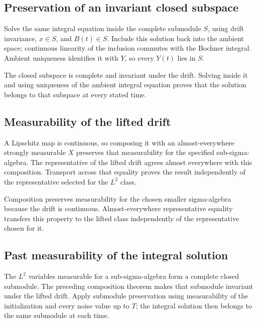\documentclass[11pt,a4paper]{report}
\begin{document}
\subsection{\texorpdfstring{Preservation of an invariant closed subspace}{Preservation of an invariant closed subspace}}
\label{report-step-UnadjustedLangevin-WeakForwardAdapted-lean-1}


Solve the same integral equation inside the complete submodule \(S\), using drift invariance, \(x\in S\), and \(B(t)\in S\). Include this solution back into the ambient space; continuous linearity of the inclusion commutes with the Bochner integral. Ambient uniqueness identifies it with \(Y\), so every \(Y(t)\) lies in \(S\).



The closed subspace is complete and invariant under the drift. Solving inside it and using uniqueness of the ambient integral equation proves that the solution belongs to that subspace at every stated time.

\subsection{\texorpdfstring{Measurability of the lifted drift}{Measurability of the lifted drift}}
\label{report-step-UnadjustedLangevin-WeakForwardAdapted-lean-2}


A Lipschitz map is continuous, so composing it with an almost-everywhere strongly measurable \(X\) preserves that measurability for the specified sub-sigma-algebra. The representative of the lifted drift agrees almost everywhere with this composition. Transport across that equality proves the result independently of the representative selected for the \(L^2\) class.



Composition preserves measurability for the chosen smaller sigma-algebra because the drift is continuous. Almost-everywhere representative equality transfers this property to the lifted class independently of the representative chosen for it.

\subsection{\texorpdfstring{Past measurability of the integral solution}{Past measurability of the integral solution}}
\label{report-step-UnadjustedLangevin-WeakForwardAdapted-lean-3}


The \(L^2\) variables measurable for a sub-sigma-algebra form a complete closed submodule. The preceding composition theorem makes that submodule invariant under the lifted drift. Apply submodule preservation using measurability of the initialization and every noise value up to \(T\); the integral solution then belongs to the same submodule at each time.
\end{document}
